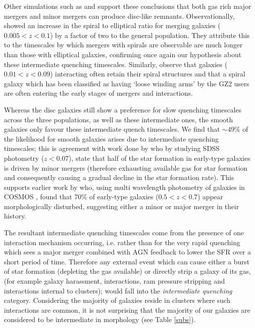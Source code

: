 \documentclass[useAMS,usenatbib]{mn2e}
\begin{document}
Other simulations such as \citet{Rob06} and \citet{Barnes02} support these conclusions that both gas rich major mergers and minor mergers can produce disc-like remnants. Observationally, \citet{Darg10a} showed an increase in the spiral to elliptical ratio for merging galaxies ($0.005 < z < 0.1$) by a factor of two to the general population. They attribute this to the timescales by which mergers with spirals are observable are much longer than those with elliptical galaxies, confirming once again our hypothesis about these intermediate quenching timescales. Similarly, \citet{Casteels13} observe that galaxies ($0.01 < z < 0.09$) interacting often retain their spiral structures and that a spiral galaxy which has been classified as having `loose winding arms' by the GZ2 users are often entering the early stages of mergers and interactions.

Whereas the disc galaxies still show a preference for slow quenching timescales across the three populations, as well as these intermediate ones, the smooth galaxies only favour these intermediate quench timescales. We find that $\sim49\%$ of the likelihood for smooth galaxies arises due to intermediate quenching timescales; this is agreement with work done by \citet{Kav14} who by studying SDSS photometry ($z<0.07$), state that half of the star formation in early-type galaxies is driven by minor mergers (therefore exhausting available gas for star formation and consequently causing a gradual decline in the star formation rate). This supports earlier work by \cite{Kav11} who, using multi wavelength photometry of galaxies in COSMOS \citep{Scoville07}, found that $70\%$ of early-type galaxies ($0.5 < z < 0.7$) appear morphologically disturbed, suggesting either a minor or major merger in their history. 

The resultant intermediate quenching timescales come from the presence of one interaction mechanism occurring, i.e. rather than for the very rapid quenching which sees a major merger combined with AGN feedback to lower the SFR over a short period of time. Therefore any external event which can cause either a burst of star formation (depleting the gas available) or directly strip a galaxy of its gas, (for example galaxy harassment, interactions, ram pressure stripping and interactions internal to clusters); would fall into the \emph{intermediate quenching} category. Considering the majority of galaxies reside in clusters where such interactions are common, it is not surprising that the majority of our galaxies are considered to be intermediate in morphology (see Table \ref{subs}).
\end{document}
